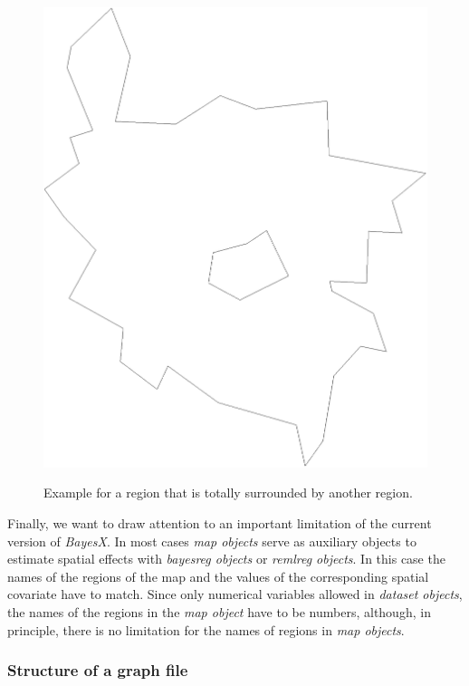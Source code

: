 \begin{figure}[hb]
\centering
\includegraphics [scale=0.3]{grafiken/westin.eps}
{\em\caption{\label{westin} Example for a region that is totally
surrounded by another region.}}
\end{figure}

Finally, we want to draw attention to an important limitation of
the current version of {\em BayesX}. In most cases {\em map
objects} serve as auxiliary objects to estimate spatial effects
with {\em bayesreg objects} or {\em remlreg objects}. In this case
the names of the regions of the map and the values of the
corresponding spatial covariate have to match. Since only
numerical variables allowed in {\em dataset objects}, the names of
the regions in the {\em map object} have to be numbers, although,
in principle, there is no limitation for the names of regions in
{\em map objects}.

\subsubsection*{Structure of a graph file}

